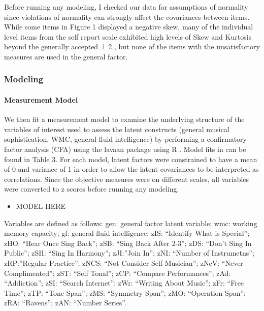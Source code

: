 \documentclass[]{book}
\providecommand{\tightlist}{%
  \setlength{\itemsep}{0pt}\setlength{\parskip}{0pt}}
\let\oldparagraph\paragraph
\renewcommand{\paragraph}[1]{\oldparagraph{#1}\mbox{}}
\begin{document}
Before running any modeling, I checked our data for assumptions of normality since violations of normality can strongly affect the covariances between items.
While some items in Figure 1 displayed a negative skew, many of the individual level items from the self report scale exhibited high
levels of Skew and Kurtosis beyond the generally accepted ± 2 \citep{fieldDiscoveringStatisticsUsing2012}, but none of the items with the unsatisfactory measures are used in the general factor.

\hypertarget{modeling}{%
\subsubsection{Modeling}\label{modeling}}

\hypertarget{measurement-model}{%
\paragraph{Measurement Model}\label{measurement-model}}

We then fit a measurement model to examine the underlying structure of the variables of interest used to assess the latent constructs (general musical sophistication, WMC, general fluid intelligence) by performing a confirmatory factor analysis (CFA) using the lavaan package \citep{rosseelLavaanPackageStructural2012} using R \citep{teamLanguageEnvironmentStatistical2015}.
Model fits in can be found in Table 3.
For each model, latent factors were constrained to have a mean of 0 and variance of 1 in order to allow the latent covariances to be interpreted as correlations.
Since the objective measures were on different scales, all variables were converted to z scores before running any modeling.

\begin{itemize}
\tightlist
\item
  MODEL HERE
\end{itemize}

Variables are defined as follows: gen: general factor latent variable; wmc: working memory capacity; gf: general fluid intelligence; zIS: ``Identify What is Special''; zHO: ``Hear Once Sing Back''; zSB: ``Sing Back After 2-3''; zDS: ``Don't Sing In Public''; zSH: ``Sing In Harmony''; zJI:''Join In''; zNI: ``Number of Instrumetns''; zRP:''Regular Practice''; zNCS: ``Not Consider Self Musician''; zNcV: ``Never Complimented''; zST: ``Self Tonal''; zCP: ``Compare Performances''; zAd: ``Addiction''; zSI: ``Search Internet''; zWr: ``Writing About Music''; zFr: ``Free Time''; zTP: ``Tone Span''; zMS: ``Symmetry Span''; zMO: ``Operation Span''; zRA: ``Ravens''; zAN: ``Number Series''.
\end{document}
